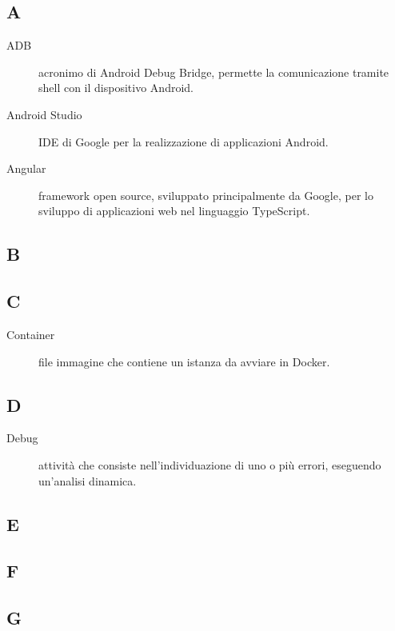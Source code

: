 \documentclass[../../../analisi-dei-requisiti.tex]{subfiles}
\begin{document}
\subsection{A}

\begin{description}
    \item[ADB] acronimo di Android Debug Bridge, permette la comunicazione tramite shell con il dispositivo Android.
    \item[Android Studio] IDE di Google per la realizzazione di applicazioni Android.
    \item[Angular] framework open source, sviluppato principalmente da Google, per lo sviluppo di applicazioni web nel linguaggio TypeScript.
\end{description}

\subsection{B}

\subsection{C}

\begin{description}
    \item[Container] file immagine che contiene un istanza da avviare in Docker.
\end{description}

\subsection{D}

\begin{description}
    \item[Debug] attività che consiste nell'individuazione di uno o più errori, eseguendo un'analisi dinamica.
\end{description}

\subsection{E}

\subsection{F}

\subsection{G}
\end{document}
